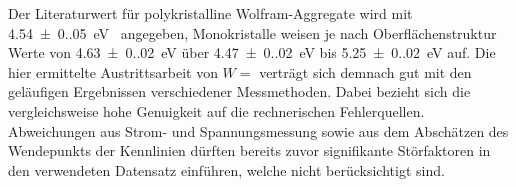 Der Literaturwert für polykristalline Wolfram-Aggregate wird mit \qty{4.54(0.05)}{\electronvolt}~\cite{hop_riv_work_function}
angegeben, Monokristalle weisen je nach Oberflächenstruktur Werte von \qty{4.63(0.02)}{\electronvolt} über
\qty{4.47(0.02)}{\electronvolt} bis \qty{5.25(0.02)}{\electronvolt} \cite{str_mac_swa_work_function} auf.
Die hier ermittelte Austrittsarbeit von $W = $ verträgt sich demnach gut mit den geläufigen
Ergebnissen verschiedener Messmethoden. Dabei bezieht sich die vergleichsweise hohe Genuigkeit auf die rechnerischen
Fehlerquellen. Abweichungen aus Strom- und Spannungsmessung sowie aus dem Abschätzen des Wendepunkts der Kennlinien dürften
bereits zuvor signifikante Störfaktoren in den verwendeten Datensatz einführen, welche nicht berücksichtigt sind.

\vfill
